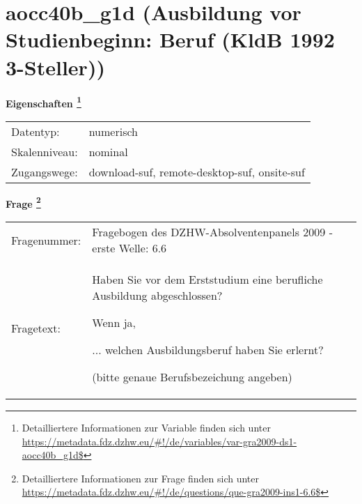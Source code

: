 
    \setcounter{footnote}{0}

    \vspace*{-1.8cm}
	\section{aocc40b\_g1d (Ausbildung vor Studienbeginn: Beruf (KldB 1992 3-Steller))}
	\label{section:aocc40b_g1d}



    \vspace*{0.5cm}
    \noindent\textbf{Eigenschaften
	\footnote{Detailliertere Informationen zur Variable finden sich unter
		\url{https://metadata.fdz.dzhw.eu/\#!/de/variables/var-gra2009-ds1-aocc40b_g1d$}}}\\
	\begin{tabularx}{\hsize}{@{}lX}
	Datentyp: & numerisch \\
	Skalenniveau: & nominal \\
	Zugangswege: &
	  download-suf, 
	  remote-desktop-suf, 
	  onsite-suf
 \\
    \end{tabularx}



				\vspace*{0.5cm}
                \noindent\textbf{Frage
	                \footnote{Detailliertere Informationen zur Frage finden sich unter
		              \url{https://metadata.fdz.dzhw.eu/\#!/de/questions/que-gra2009-ins1-6.6$}}}\\
				\begin{tabularx}{\hsize}{@{}lX}
					Fragenummer: &
					  Fragebogen des DZHW-Absolventenpanels 2009 - erste Welle:
					  6.6
 \\
					Fragetext: & Haben Sie vor dem Erststudium eine berufliche Ausbildung abgeschlossen?\par  Wenn ja,\par  ... welchen Ausbildungsberuf haben Sie erlernt?\par  (bitte genaue Berufsbezeichung angeben) \\
				\end{tabularx}





